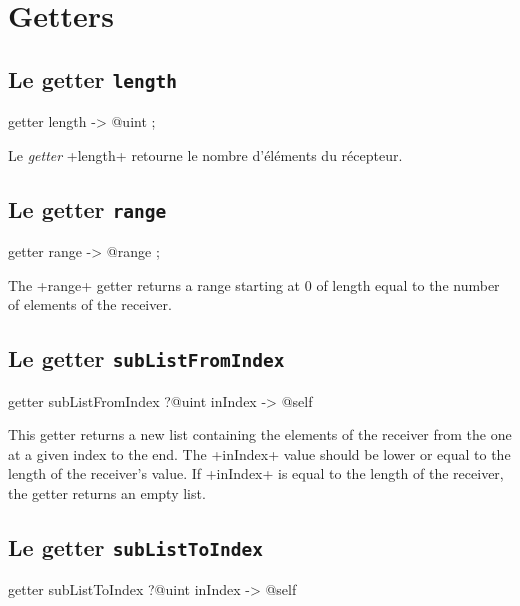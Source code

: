\section{Getters}

\subsection{Le getter \texttt{length}}

\begin{galgas}
getter length -> @uint ;
\end{galgas}

Le \emph{getter} \ggs+length+ retourne le nombre d'éléments du récepteur.


\subsection{Le getter \texttt{range}}

\begin{galgas}
getter range -> @range ;
\end{galgas}

The \ggs+range+ getter returns a range starting at $0$ of length equal to the number of elements of the receiver.




\subsection{Le getter \texttt{subListFromIndex}}

\begin{galgas}
getter subListFromIndex ?@uint inIndex -> @self
\end{galgas}

This getter returns a new list containing the elements of the receiver from the one at a given index to the end. The  \ggs+inIndex+ value should be lower or equal to the length of the receiver's value. If \ggs+inIndex+ is equal to the length of the receiver, the getter returns an empty list.






\subsection{Le getter \texttt{subListToIndex}}

\begin{galgas}
getter subListToIndex ?@uint inIndex -> @self
\end{galgas}

